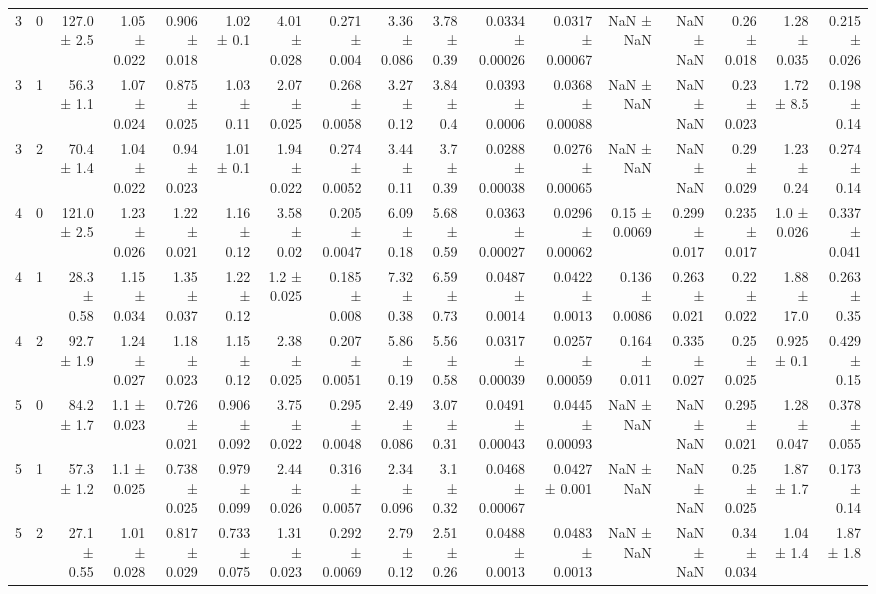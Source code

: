 \begin{tabular}{rrrrrrrrrrrrrrrrr}
  3 & 0 & 127.0 ± 2.5 & 1.05 ± 0.022 & 0.906 ± 0.018 & 1.02 ± 0.1 & 4.01 ± 0.028 & 0.271 ± 0.004 & 3.36 ± 0.086 & 3.78 ± 0.39 & 0.0334 ± 0.00026 & 0.0317 ± 0.00067 & NaN ± NaN & NaN ± NaN & 0.26 ± 0.018 & 1.28 ± 0.035 & 0.215 ± 0.026 \\
  3 & 1 & 56.3 ± 1.1 & 1.07 ± 0.024 & 0.875 ± 0.025 & 1.03 ± 0.11 & 2.07 ± 0.025 & 0.268 ± 0.0058 & 3.27 ± 0.12 & 3.84 ± 0.4 & 0.0393 ± 0.0006 & 0.0368 ± 0.00088 & NaN ± NaN & NaN ± NaN & 0.23 ± 0.023 & 1.72 ± 8.5 & 0.198 ± 0.14 \\
  3 & 2 & 70.4 ± 1.4 & 1.04 ± 0.022 & 0.94 ± 0.023 & 1.01 ± 0.1 & 1.94 ± 0.022 & 0.274 ± 0.0052 & 3.44 ± 0.11 & 3.7 ± 0.39 & 0.0288 ± 0.00038 & 0.0276 ± 0.00065 & NaN ± NaN & NaN ± NaN & 0.29 ± 0.029 & 1.23 ± 0.24 & 0.274 ± 0.14 \\
  4 & 0 & 121.0 ± 2.5 & 1.23 ± 0.026 & 1.22 ± 0.021 & 1.16 ± 0.12 & 3.58 ± 0.02 & 0.205 ± 0.0047 & 6.09 ± 0.18 & 5.68 ± 0.59 & 0.0363 ± 0.00027 & 0.0296 ± 0.00062 & 0.15 ± 0.0069 & 0.299 ± 0.017 & 0.235 ± 0.017 & 1.0 ± 0.026 & 0.337 ± 0.041 \\
  4 & 1 & 28.3 ± 0.58 & 1.15 ± 0.034 & 1.35 ± 0.037 & 1.22 ± 0.12 & 1.2 ± 0.025 & 0.185 ± 0.008 & 7.32 ± 0.38 & 6.59 ± 0.73 & 0.0487 ± 0.0014 & 0.0422 ± 0.0013 & 0.136 ± 0.0086 & 0.263 ± 0.021 & 0.22 ± 0.022 & 1.88 ± 17.0 & 0.263 ± 0.35 \\
  4 & 2 & 92.7 ± 1.9 & 1.24 ± 0.027 & 1.18 ± 0.023 & 1.15 ± 0.12 & 2.38 ± 0.025 & 0.207 ± 0.0051 & 5.86 ± 0.19 & 5.56 ± 0.58 & 0.0317 ± 0.00039 & 0.0257 ± 0.00059 & 0.164 ± 0.011 & 0.335 ± 0.027 & 0.25 ± 0.025 & 0.925 ± 0.1 & 0.429 ± 0.15 \\
  5 & 0 & 84.2 ± 1.7 & 1.1 ± 0.023 & 0.726 ± 0.021 & 0.906 ± 0.092 & 3.75 ± 0.022 & 0.295 ± 0.0048 & 2.49 ± 0.086 & 3.07 ± 0.31 & 0.0491 ± 0.00043 & 0.0445 ± 0.00093 & NaN ± NaN & NaN ± NaN & 0.295 ± 0.021 & 1.28 ± 0.047 & 0.378 ± 0.055 \\
  5 & 1 & 57.3 ± 1.2 & 1.1 ± 0.025 & 0.738 ± 0.025 & 0.979 ± 0.099 & 2.44 ± 0.026 & 0.316 ± 0.0057 & 2.34 ± 0.096 & 3.1 ± 0.32 & 0.0468 ± 0.00067 & 0.0427 ± 0.001 & NaN ± NaN & NaN ± NaN & 0.25 ± 0.025 & 1.87 ± 1.7 & 0.173 ± 0.14 \\
  5 & 2 & 27.1 ± 0.55 & 1.01 ± 0.028 & 0.817 ± 0.029 & 0.733 ± 0.075 & 1.31 ± 0.023 & 0.292 ± 0.0069 & 2.79 ± 0.12 & 2.51 ± 0.26 & 0.0488 ± 0.0013 & 0.0483 ± 0.0013 & NaN ± NaN & NaN ± NaN & 0.34 ± 0.034 & 1.04 ± 1.4 & 1.87 ± 1.8 \\\hline
\end{tabular}
